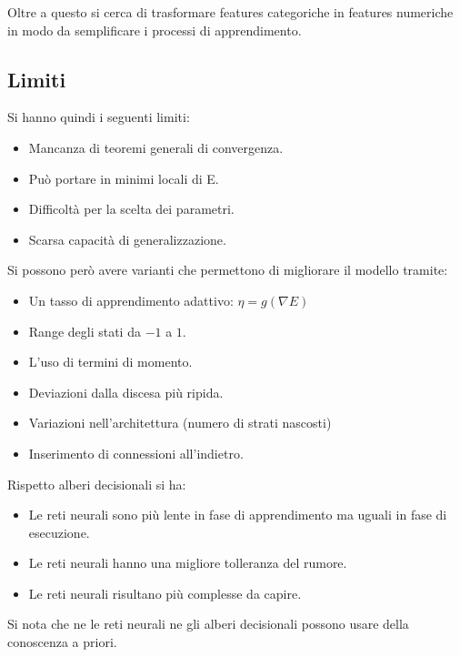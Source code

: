 Oltre a questo si cerca di trasformare features categoriche in features numeriche in modo da semplificare i processi di apprendimento.
\subsection{Limiti}
Si hanno quindi i seguenti limiti:
\begin{itemize}
    \item Mancanza di teoremi generali di convergenza.
    \item Può portare in minimi locali di E.
    \item Difficoltà per la scelta dei parametri.
    \item Scarsa capacità di generalizzazione.
\end{itemize}
Si possono però avere varianti che permettono di migliorare il modello tramite:
\begin{itemize}
    \item Un tasso di apprendimento adattivo: $\eta = g(\nabla E)$
    \item Range degli stati da $-1$ a $1$.
    \item L'uso di termini di momento.
    \item Deviazioni dalla discesa più ripida.
    \item Variazioni nell'architettura (numero di strati nascosti)
    \item Inserimento di connessioni all'indietro.
\end{itemize}

\begin{osservazione}
    Rispetto alberi decisionali si ha:
    \begin{itemize}
        \item Le reti neurali sono più lente in fase di apprendimento ma uguali in fase di esecuzione.
        \item Le reti neurali hanno una migliore tolleranza del rumore.
        \item Le reti neurali risultano più complesse da capire.
    \end{itemize}

    Si nota che ne le reti neurali ne gli alberi decisionali possono usare della conoscenza a priori.
\end{osservazione}